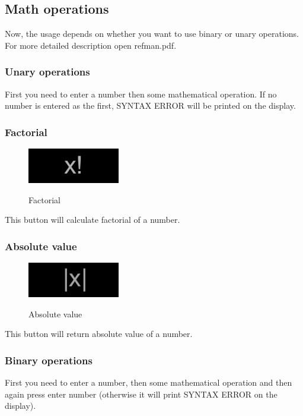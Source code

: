 \documentclass[11pt, a4paper]{article}
\begin{document}
    \newpage

    \subsection{Math operations}
    \label{subsec:mathOperations}
    Now, the usage depends on whether you want to use binary or unary operations. \newline
    For more detailed description open refman.pdf.


    \subsubsection{Unary operations}
    First you need to enter a number then some mathematical operation. If no number is entered as the first, SYNTAX ERROR will be printed on the display.

    \subsubsection{Factorial}
    \label{subsubsec:factorial}
    \begin{figure}[hbt!]
        \caption{Factorial}
        \includegraphics[scale = 0.2]{factorial}
        \centering
        \label{fig:fact}
    \end{figure}
    This button will calculate factorial of a number.

    \subsubsection{Absolute value}
    \label{subsubsec:absolute_value}
    \begin{figure}[hbt!]
        \caption{Absolute value}
        \includegraphics[scale = 0.2]{abs}
        \centering
        \label{fig:abs_v}
    \end{figure}
    This button will return absolute value of a number.

    \subsubsection{Binary operations}
    First you need to enter a number, then some mathematical operation and then again press enter number (otherwise it will print SYNTAX ERROR on the display).
\end{document}

